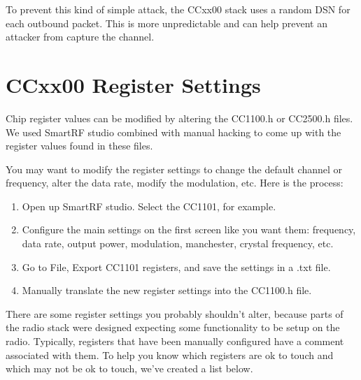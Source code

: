 \documentclass{article}
\begin{document}
To prevent this kind of simple attack, the CCxx00 stack uses a random DSN for each outbound packet.
This is more unpredictable and can help prevent an attacker from capture the channel. 


\section{CCxx00 Register Settings}
\label{sec:Ccxx00RegisterSettings}
Chip register values can be modified by altering the CC1100.h or CC2500.h files. We used
SmartRF studio combined with manual hacking to come up with the register values found
in these files.

You may want to modify the register settings to change the default channel or frequency,
alter the data rate, modify the modulation, etc.  Here is the process:

\begin{enumerate}
	\item Open up SmartRF studio.  Select the CC1101, for example.
	\item Configure the main settings on the first screen like you want them: frequency,
	data rate, output power, modulation, manchester, crystal frequency, etc.
	\item Go to File, Export CC1101 registers, and save the settings in a .txt file.
	\item Manually translate the new register settings into the CC1100.h file.
\end{enumerate}

There are some register settings you probably shouldn't alter, because parts of the 
radio stack were designed expecting some functionality to be setup on the radio.
Typically, registers that have been manually configured have a comment associated with them.
To help you know which registers are ok to touch and which may not be ok to touch, 
we've created a list below.
\end{document}
